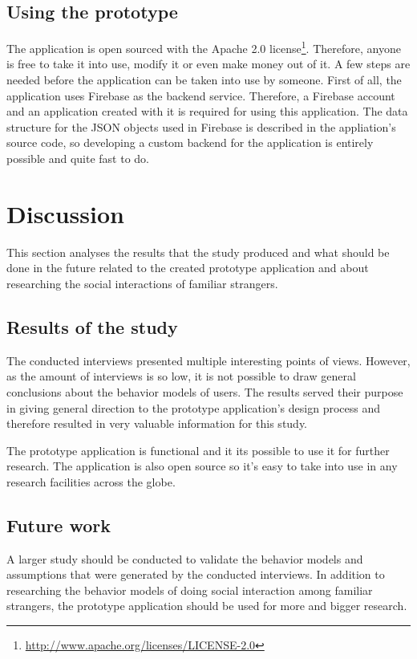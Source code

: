 \subsection{Using the prototype}

The application is open sourced with the Apache 2.0 license\footnote{\url{http://www.apache.org/licenses/LICENSE-2.0}}. Therefore, anyone is free to take it into use, modify it or even make money out of it. A few steps are needed before the application can be taken into use by someone. First of all, the application uses Firebase as the backend service. Therefore, a Firebase account and an application created with it is required for using this application. The data structure for the JSON objects used in Firebase is described in the appliation's source code, so developing a custom backend for the application is entirely possible and quite fast to do.

\section{Discussion}

This section analyses the results that the study produced and what should be done in the future related to the created prototype application and about researching the social interactions of familiar strangers.

\subsection{Results of the study}

The conducted interviews presented multiple interesting points of views. However, as the amount of interviews is so low, it is not possible to draw general conclusions about the behavior models of users. The results served their purpose in giving general direction to the prototype application's design process and therefore resulted in very valuable information for this study.

The prototype application is functional and it its possible to use it for further research. The application is also open source so it's easy to take into use in any research facilities across the globe.

\subsection{Future work}

A larger study should be conducted to validate the behavior models and assumptions that were generated by the conducted interviews. In addition to researching the behavior models of doing social interaction among familiar strangers, the prototype application should be used for more and bigger research.

